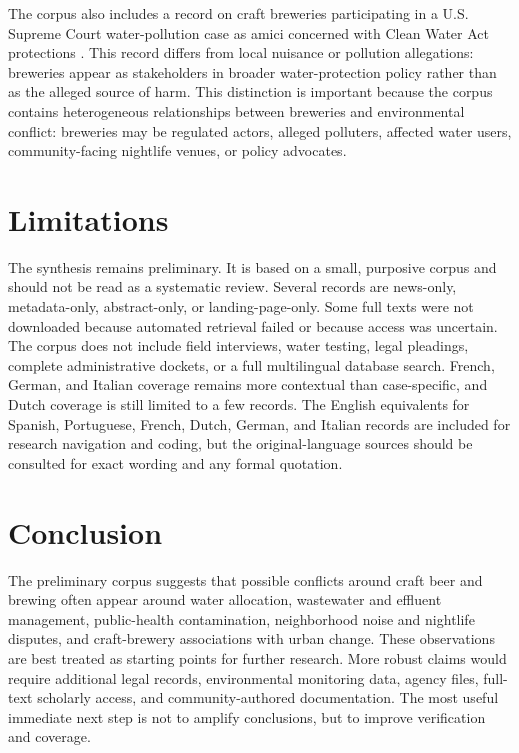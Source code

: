 \documentclass[man,12pt]{apa7}
\begin{document}
The corpus also includes a record on craft breweries participating in a U.S. Supreme Court water-pollution case as amici concerned with Clean Water Act protections \cite{NEWS_2019_US_maui-clean-water-brewers_N004}. This record differs from local nuisance or pollution allegations: breweries appear as stakeholders in broader water-protection policy rather than as the alleged source of harm. This distinction is important because the corpus contains heterogeneous relationships between breweries and environmental conflict: breweries may be regulated actors, alleged polluters, affected water users, community-facing nightlife venues, or policy advocates.

\section{Limitations}

The synthesis remains preliminary. It is based on a small, purposive corpus and should not be read as a systematic review. Several records are news-only, metadata-only, abstract-only, or landing-page-only. Some full texts were not downloaded because automated retrieval failed or because access was uncertain. The corpus does not include field interviews, water testing, legal pleadings, complete administrative dockets, or a full multilingual database search. French, German, and Italian coverage remains more contextual than case-specific, and Dutch coverage is still limited to a few records. The English equivalents for Spanish, Portuguese, French, Dutch, German, and Italian records are included for research navigation and coding, but the original-language sources should be consulted for exact wording and any formal quotation.

\section{Conclusion}

The preliminary corpus suggests that possible conflicts around craft beer and brewing often appear around water allocation, wastewater and effluent management, public-health contamination, neighborhood noise and nightlife disputes, and craft-brewery associations with urban change. These observations are best treated as starting points for further research. More robust claims would require additional legal records, environmental monitoring data, agency files, full-text scholarly access, and community-authored documentation. The most useful immediate next step is not to amplify conclusions, but to improve verification and coverage.



\end{document}
